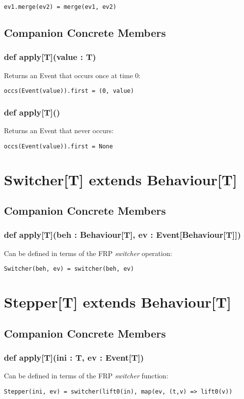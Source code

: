 \begin{verbatim}
ev1.merge(ev2) = merge(ev1, ev2)
\end{verbatim}   

 \subsection*{Companion Concrete Members}
  \subsubsection*{def apply[T](value : T)}
    Returns an Event that occurs once at time 0:
  
\begin{verbatim}
occs(Event(value)).first = (0, value) 
\end{verbatim} 

  \subsubsection*{def apply[T]()}
    Returns an Event that never occurs:

\begin{verbatim}
occs(Event(value)).first = None
\end{verbatim} 

   \section*{Switcher[T] extends Behaviour[T]}
    \subsection*{Companion Concrete Members}
      \subsubsection*{def apply[T](beh : Behaviour[T], ev : Event[Behaviour[T]])}
        Can be defined in terms of the FRP \emph{switcher}
        operation:

\begin{verbatim}
Switcher(beh, ev) = switcher(beh, ev)
\end{verbatim}   

  \section*{Stepper[T] extends Behaviour[T]}
    \subsection*{Companion Concrete Members}
      \subsubsection*{def apply[T](ini : T, ev : Event[T])}
        Can be defined in terms of the FRP \emph{switcher} function:

\begin{verbatim}
Stepper(ini, ev) = switcher(lift0(in), map(ev, (t,v) => lift0(v))
\end{verbatim}